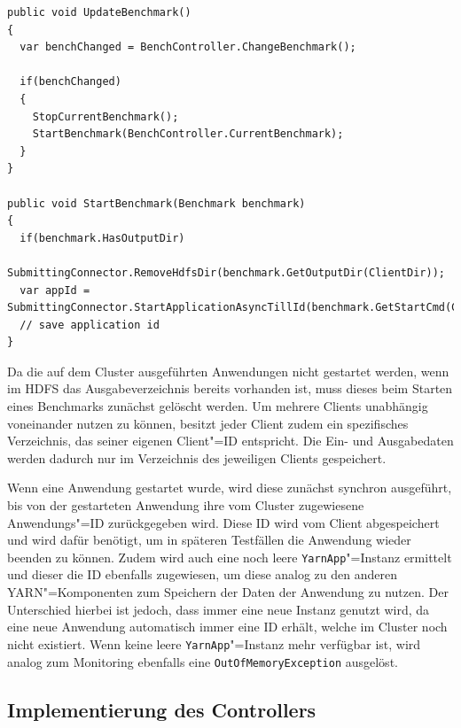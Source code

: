 \begin{lstlisting}[label=lst:startClientBenchmark,style=cs,
caption={[Auswahl und Start des nachfolgenden Benchmarks]
    Auswahl und Start des nachfolgenden Benchmarks (gekürzt).
    Die Methode \texttt{ChangeBenchmark()} des Benchmark"=Controllers wird in \cref{subsec:selectionNextBenchmark} erläutert.}]
public void UpdateBenchmark()
{
  var benchChanged = BenchController.ChangeBenchmark();
  
  if(benchChanged)
  {
    StopCurrentBenchmark();
    StartBenchmark(BenchController.CurrentBenchmark);
  }
}

public void StartBenchmark(Benchmark benchmark)
{
  if(benchmark.HasOutputDir)
    SubmittingConnector.RemoveHdfsDir(benchmark.GetOutputDir(ClientDir));
  var appId = SubmittingConnector.StartApplicationAsyncTillId(benchmark.GetStartCmd(ClientDir));
  // save application id
}
\end{lstlisting}

Da die auf dem Cluster ausgeführten Anwendungen \uU nicht gestartet werden, wenn im HDFS das Ausgabeverzeichnis bereits vorhanden ist, muss dieses beim Starten eines Benchmarks zunächst gelöscht werden.
Um mehrere Clients unabhängig voneinander nutzen zu können, besitzt jeder Client zudem ein spezifisches Verzeichnis, das seiner eigenen Client"=ID entspricht.
Die Ein- und Ausgabedaten werden dadurch nur im Verzeichnis des jeweiligen Clients gespeichert.

Wenn eine Anwendung gestartet wurde, wird diese zunächst synchron ausgeführt, bis von der gestarteten Anwendung ihre vom Cluster zugewiesene Anwendungs"=ID zurückgegeben wird.
Diese ID wird vom Client abgespeichert und wird dafür benötigt, um in späteren Testfällen die Anwendung wieder beenden zu können.
Zudem wird auch eine noch leere \texttt{YarnApp}"=Instanz ermittelt und dieser die ID ebenfalls zugewiesen, um diese analog zu den anderen YARN"=Komponenten zum Speichern der Daten der Anwendung zu nutzen.
Der Unterschied hierbei ist jedoch, dass immer eine neue Instanz genutzt wird, da eine neue Anwendung automatisch immer eine ID erhält, welche im Cluster noch nicht existiert.
Wenn keine leere \texttt{YarnApp}"=Instanz mehr verfügbar ist, wird analog zum Monitoring ebenfalls eine \texttt{OutOfMemoryException} ausgelöst.

\subsection{Implementierung des Controllers}
\label{subsec:yarnController}


